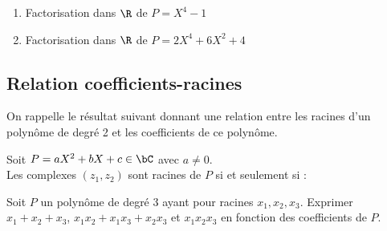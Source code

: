 \documentclass[a4paper, 11pt,reqno]{article}
\begin{document}
{\footnotesize
\begin{exercice}
	\begin{enumerate}
		\item Factorisation dans $\R$ de $P=X^4-1$
		\item Factorisation dans $\R$ de $P=2X^4+6X^2+4$
	\end{enumerate}
\end{exercice}}

\subsection{Relation coefficients-racines}

\noindent On rappelle le r\'esultat suivant donnant une relation entre les racines d'un polyn\^ome de degr\'e 2 et les coefficients de ce polyn\^ome.\vsec

{\noindent

	\begin{prop}
		Soit $P=aX^2+bX+c \in\bC$ avec $a\not=0$.\\
		Les complexes $(z_1,z_2)$ sont racines de $P$ si et seulement si : \vsec

	\end{prop}
}\vsec

{\footnotesize
	\begin{exercice}
		Soit $P$ un polyn\^ome de degr\'e 3 ayant pour racines $x_1, x_2, x_3$. Exprimer $x_1 + x_2 + x_3$, $x_1 x_2 + x_1 x_3 + x_2 x_3$ et $x_1 x_2 x_3$ en fonction des coefficients de $P$.
	\end{exercice}}
\end{document}
